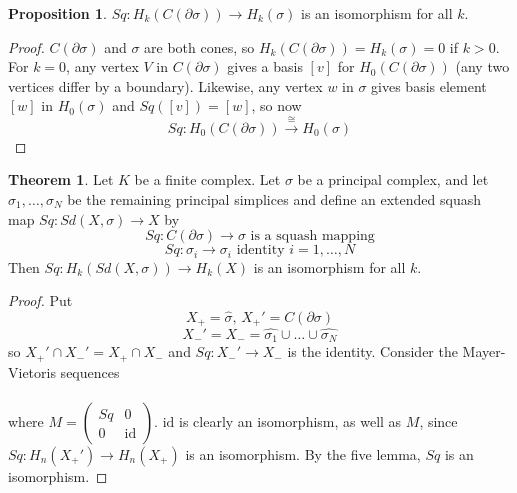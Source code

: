 \documentclass[a4paper,14pt]{extarticle}
\theoremstyle{definition}
\newtheorem*{theorem}{Theorem}
\newtheorem*{proposition}{Proposition}
\begin{document}
\begin{proposition}
	$Sq:H_k(C(\partial\sigma))\rightarrow H_k(\sigma)$ is an isomorphism for all $k$.
\end{proposition}

\begin{proof}
	$C(\partial\sigma)$ and $\sigma$ are both cones, so $H_k(C(\partial\sigma))=H_k(\sigma)=0$ if 
	$k>0$. For $k=0$, any vertex $V$ in $C(\partial\sigma)$ gives a basis $[v]$ for 
	$H_0(C(\partial\sigma))$ (any two vertices differ by a boundary). Likewise, any vertex $w$
	in $\sigma$ gives basis element $[w]$ in $H_0(\sigma)$ and $Sq([v])=[w]$, so now 
	\[Sq:H_0(C(\partial\sigma))\xrightarrow{\cong}H_0(\sigma)\]
\end{proof}

\begin{theorem}
	Let $K$ be a finite complex. Let $\sigma$ be a principal complex, and let 
	$\sigma_1,\ldots,\sigma_N$ be the remaining principal simplices and define an extended
	squash map $Sq:Sd(X,\sigma)\rightarrow X$ by 
	\[Sq:C(\partial\sigma)\rightarrow\sigma\text{ is a squash mapping}\]
	\[Sq:\sigma_i\rightarrow\sigma_i\text{ identity }i=1,\ldots,N\]
	Then $Sq:H_k(Sd(X,\sigma))\rightarrow H_k(X)$ is an isomorphism for all $k$.
\end{theorem}

\begin{proof}
	Put \[X_+=\hat{\sigma}, \,X_+'=C(\partial\sigma)\]
	\[X_-'=X_-=\hat{\sigma_1}\cup\ldots\cup\hat{\sigma_N}\] so $X_+'\cap X_-'=X_+\cap X_-$ and
	$Sq:X_-'\rightarrow X_-$ is the identity. Consider the Mayer-Vietoris sequences \\
	\vspace{12pt}
	 \\
	\vspace{12pt}
	where $M=\begin{pmatrix}Sq&0\\0&\text{id}\end{pmatrix}$. $\text{id}$ is clearly an
	isomorphism, as well as $M$, since $Sq:H_n(X_+')\rightarrow H_n(X_+)$ is an isomorphism.
	By the five lemma, $Sq$ is an	isomorphism.
\end{proof}
\end{document}
